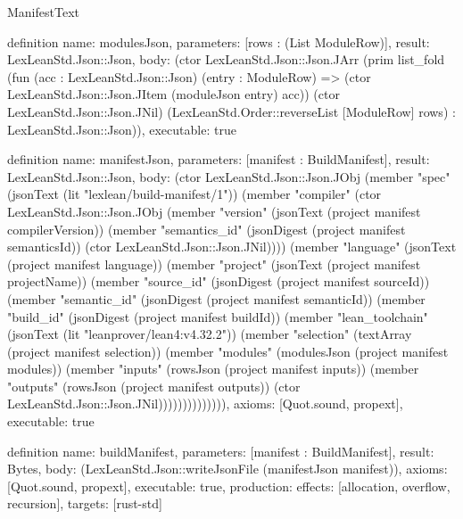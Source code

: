 \begin{lexlean}{ManifestText}
\begin{semanticmodule}
definition{
  name: modulesJson,
  parameters: [rows : (List ModuleRow)],
  result: LexLeanStd.Json::Json,
  body: (ctor LexLeanStd.Json::Json.JArr (prim list_fold (fun (acc : LexLeanStd.Json::Json) (entry : ModuleRow) => (ctor LexLeanStd.Json::Json.JItem (moduleJson entry) acc)) (ctor LexLeanStd.Json::Json.JNil) (LexLeanStd.Order::reverseList [ModuleRow] rows) : LexLeanStd.Json::Json)),
  executable: true
}

definition{
  name: manifestJson,
  parameters: [manifest : BuildManifest],
  result: LexLeanStd.Json::Json,
  body: (ctor LexLeanStd.Json::Json.JObj (member "spec" (jsonText (lit "lexlean/build-manifest/1")) (member "compiler" (ctor LexLeanStd.Json::Json.JObj (member "version" (jsonText (project manifest compilerVersion)) (member "semantics_id" (jsonDigest (project manifest semanticsId)) (ctor LexLeanStd.Json::Json.JNil)))) (member "language" (jsonText (project manifest language)) (member "project" (jsonText (project manifest projectName)) (member "source_id" (jsonDigest (project manifest sourceId)) (member "semantic_id" (jsonDigest (project manifest semanticId)) (member "build_id" (jsonDigest (project manifest buildId)) (member "lean_toolchain" (jsonText (lit "leanprover/lean4:v4.32.2")) (member "selection" (textArray (project manifest selection)) (member "modules" (modulesJson (project manifest modules)) (member "inputs" (rowsJson (project manifest inputs)) (member "outputs" (rowsJson (project manifest outputs)) (ctor LexLeanStd.Json::Json.JNil)))))))))))))),
  axioms: [Quot.sound, propext],
  executable: true
}

definition{
  name: buildManifest,
  parameters: [manifest : BuildManifest],
  result: Bytes,
  body: (LexLeanStd.Json::writeJsonFile (manifestJson manifest)),
  axioms: [Quot.sound, propext],
  executable: true,
  production: {effects: [allocation, overflow, recursion], targets: [rust-std]}
}
\end{semanticmodule}
\end{lexlean}
